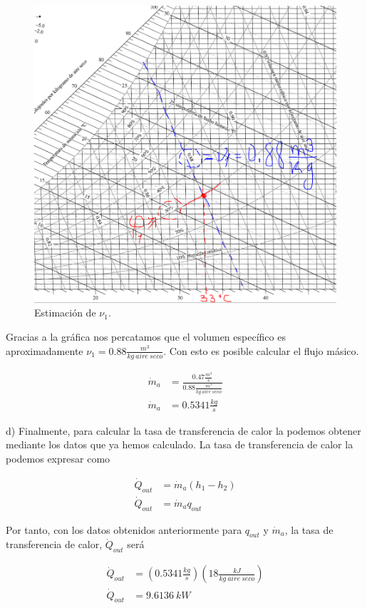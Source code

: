 \documentclass[12pt, letterpaper]{article}
\begin{document}
\begin{figure}[H]
	\centering
	\includegraphics[width=\textwidth]{4.png}
	\caption{Estimación de $\nu_1$.}
\end{figure}

Gracias a la gráfica nos percatamos que el volumen específico es aproximadamente $\nu_1 = 0.88 \frac{m^3}{kg\ aire\ seco}$. Con esto es posible calcular el flujo másico.

\begin{equation}
	\boxed{
	\begin{split}
		\dot m_a &= \frac{0.47 \frac{m^3}{s}}{0.88 \frac{m^3}{kg\ aire\ seco}}\\
		\dot m_a &= 0.5341 \frac{kg}{s}
	\end{split}}
\end{equation}

d) Finalmente, para calcular la tasa de transferencia de calor la podemos obtener mediante los datos que ya hemos calculado. La tasa de transferencia de calor la podemos expresar como

\begin{equation}
	\begin{split}
		\dot Q_{out} &= \dot m_a (h_1 - h_2)\\
		\dot Q_{out} &= \dot m_a q_{out}
	\end{split}
\end{equation}

Por tanto, con los datos obtenidos anteriormente para $q_{out}$ y $\dot m_a$, la tasa de transferencia de calor, $\dot Q_{out}$ será

\begin{equation}
	\boxed{
	\begin{split}
		\dot Q_{out} &= (0.5341 \frac{kg}{s})(18 \frac{kJ}{kg\ aire\ seco})\\
		\dot Q_{out} &= 9.6136\ kW
	\end{split}}
\end{equation}
\renewcommand\refname{Referencias}
\printbibliography
\end{document}
